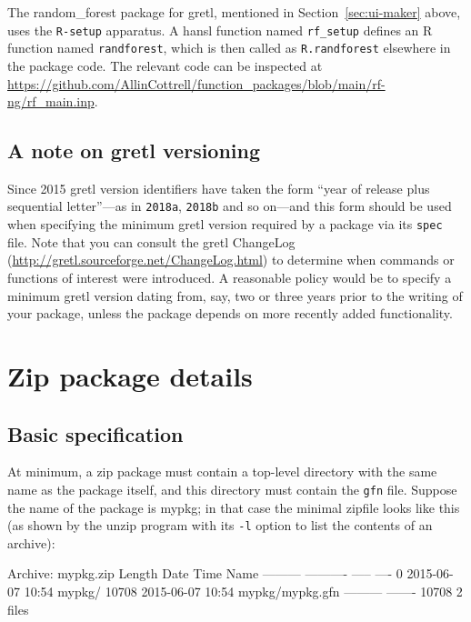 \documentclass[oneside]{book}
\begin{document}
\begin{description}
The \textsf{random\_forest} package for gretl, mentioned in
Section~\ref{sec:ui-maker} above, uses the \texttt{R-setup} apparatus.
A hansl function named \texttt{rf\_setup} defines an \textsf{R}
function named \texttt{randforest}, which is then called as
\texttt{R.randforest} elsewhere in the package code. The relevant code
can be inspected at
\url{https://github.com/AllinCottrell/function_packages/blob/main/rf-ng/rf_main.inp}.

\end{description}


\section{A note on gretl versioning}
\label{sec:versioning}

Since 2015 gretl version identifiers have taken the form ``year of
release plus sequential letter''---as in \texttt{2018a},
\texttt{2018b} and so on---and this form should be used when
specifying the minimum gretl version required by a package via its
\texttt{spec} file. Note that you can consult the gretl ChangeLog
(\url{http://gretl.sourceforge.net/ChangeLog.html}) to determine when
commands or functions of interest were introduced. A reasonable policy
would be to specify a minimum gretl version dating from, say, two or
three years prior to the writing of your package, unless the package
depends on more recently added functionality.

\chapter{Zip package details}
\label{chap:zipfile}

\section{Basic specification}

At minimum, a zip package must contain a top-level directory with the
same name as the package itself, and this directory must contain the
\texttt{gfn} file. Suppose the name of the package is \textsf{mypkg};
in that case the minimal zipfile looks like this (as shown by the
\textsf{unzip} program with its \texttt{-l} option to list the
contents of an archive):

\begin{code}
Archive:  mypkg.zip
  Length      Date    Time    Name
---------  ---------- -----   ----
        0  2015-06-07 10:54   mypkg/
    10708  2015-06-07 10:54   mypkg/mypkg.gfn
---------                     -------
    10708                     2 files
\end{code}
\end{document}

